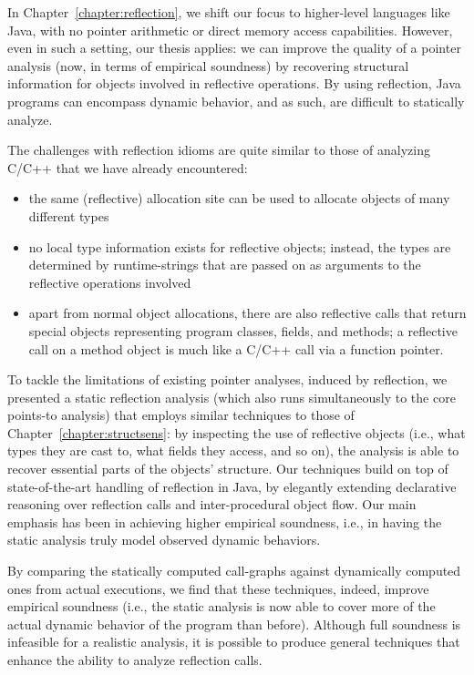 In Chapter~\ref{chapter:reflection}, we shift our focus to
higher-level languages like Java, with no pointer arithmetic or direct
memory access capabilities. However, even in such a setting, our thesis
applies: we can improve the quality of a pointer analysis (now, in
terms of empirical soundness) by recovering structural information for
objects involved in reflective operations. By using reflection, Java
programs can encompass dynamic behavior, and as such, are difficult to
statically analyze.


The challenges with reflection idioms are quite similar to those of
analyzing C/C++ that we have already encountered:
\begin{itemize}[\(\cdot\)]
\item the same (reflective) allocation site can be used to allocate
  objects of many different types
\item no local type information exists for reflective objects;
  instead, the types are determined by runtime-strings that are passed
  on as arguments to the reflective operations involved
\item apart from normal object allocations, there are also reflective
  calls that return special objects representing program classes,
  fields, and methods; a reflective call on a method object is much
  like a C/C++ call via a function pointer.
\end{itemize}

To tackle the limitations of existing pointer analyses, induced by
reflection, we presented a static reflection analysis (which also runs
simultaneously to the core points-to analysis) that employs similar
techniques to those of Chapter~\ref{chapter:structsens}: by inspecting
the use of reflective objects (i.e., what types they are cast to, what
fields they access, and so on), the analysis is able to recover
essential parts of the objects' structure. Our techniques build on top
of state-of-the-art handling of reflection in Java, by elegantly
extending declarative reasoning over reflection calls and
inter-procedural object flow. Our main emphasis has been in achieving
higher empirical soundness, i.e., in having the static analysis truly
model observed dynamic behaviors.

By comparing the statically computed call-graphs against dynamically
computed ones from actual executions, we find that these techniques,
indeed, improve empirical soundness (i.e., the static analysis is now
able to cover more of the actual dynamic behavior of the program than
before). Although full soundness is infeasible for a realistic
analysis, it is possible to produce general techniques that enhance
the ability to analyze reflection calls.

